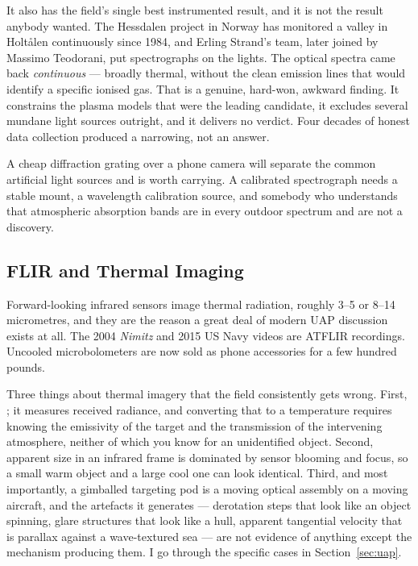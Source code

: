 It also has the field's single best instrumented result, and it is not the result anybody
wanted. The Hessdalen project in Norway has monitored a valley in Holt\aa{}len continuously
since 1984, and Erling Strand's team, later joined by Massimo Teodorani, put spectrographs on
the lights. The optical spectra came back \emph{continuous} --- broadly thermal, without the
clean emission lines that would identify a specific ionised gas. That is a genuine, hard-won,
awkward finding. It constrains the plasma models that were the leading candidate, it excludes
several mundane light sources outright, and it delivers no verdict. Four decades of honest data
collection produced a narrowing, not an answer.


A cheap diffraction grating over a phone camera will separate the common artificial light
sources and is worth carrying. A calibrated spectrograph needs a stable mount, a wavelength
calibration source, and somebody who understands that atmospheric absorption bands are in every
outdoor spectrum and are not a discovery.

\Needspace*{0.40\textheight}
\subsection{FLIR and Thermal Imaging}

Forward-looking infrared sensors image thermal radiation, roughly 3--5 or 8--14 micrometres,
and they are the reason a great deal of modern UAP discussion exists at all. The 2004
\emph{Nimitz} and 2015 US Navy videos are ATFLIR recordings. Uncooled microbolometers are now
sold as phone accessories for a few hundred pounds.

Three things about thermal imagery that the field consistently gets wrong. First, ; it measures received radiance, and converting
that to a temperature requires knowing the emissivity of the target and the transmission of the
intervening atmosphere, neither of which you know for an unidentified object. Second, apparent
size in an infrared frame is dominated by sensor blooming and focus, so a small warm object and
a large cool one can look identical. Third, and most importantly, a gimballed targeting pod is a
moving optical assembly on a moving aircraft, and the artefacts it generates --- derotation
steps that look like an object spinning, glare structures that look like a hull, apparent
tangential velocity that is parallax against a wave-textured sea --- are not evidence of
anything except the mechanism producing them. I go through the specific cases in
Section~\ref{sec:uap}.


